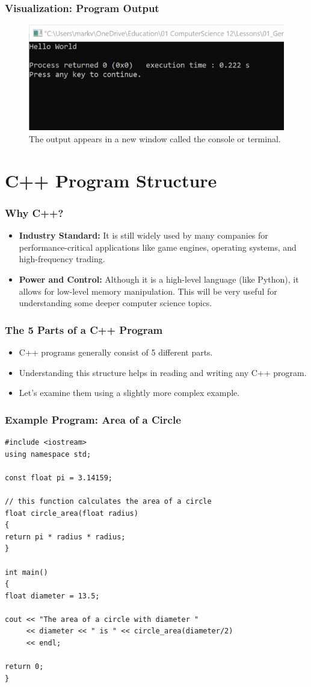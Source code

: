 \documentclass{beamer}
\begin{document}
\begin{frame}
\frametitle{Visualization: Program Output}
\begin{figure}
\centering
\includegraphics[width=0.8\linewidth]{cs12-console-hello-world-output.png}
\caption{The output appears in a new window called the console or terminal.}
\end{figure}
\end{frame}

\section{C++ Program Structure}

\begin{frame}
\frametitle{Why C++?}
\begin{itemize}
\item \textbf{Industry Standard:} It is still widely used by many companies for performance-critical applications like game engines, operating systems, and high-frequency trading.
\pause
\item \textbf{Power and Control:} Although it is a high-level language (like Python), it allows for low-level memory manipulation. This will be very useful for understanding some deeper computer science topics.
\end{itemize}
\end{frame}

\begin{frame}
\frametitle{The 5 Parts of a C++ Program}
\begin{itemize}
\item C++ programs generally consist of 5 different parts.
\item Understanding this structure helps in reading and writing any C++ program.
\item Let's examine them using a slightly more complex example.
\end{itemize}
\end{frame}

\begin{frame}[fragile]
\frametitle{Example Program: Area of a Circle}
\begin{lstlisting}
#include <iostream>
using namespace std;

const float pi = 3.14159;

// this function calculates the area of a circle
float circle_area(float radius)
{
return pi * radius * radius;
}

int main()
{
float diameter = 13.5;
    
cout << "The area of a circle with diameter "
     << diameter << " is " << circle_area(diameter/2)
     << endl;

return 0;
}
\end{lstlisting}
\end{frame}
\end{document}
